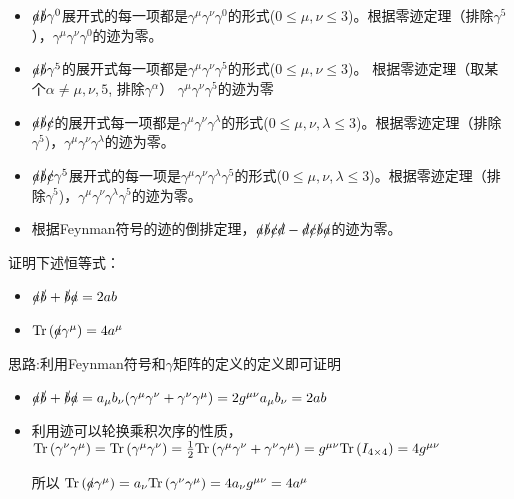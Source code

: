 \documentclass[CJK]{beamer}
\begin{document}
\begin{frame}
\bch
{\small
\begin{itemize}
\item{$\slashed{a}\slashed{b}\gamma^0$展开式的每一项都是$\gamma^\mu\gamma^\nu\gamma^0$的形式($0\le \mu,\nu\le 3$)。根据零迹定理（排除$\gamma^5$），$\gamma^\mu\gamma^\nu\gamma^0$的迹为零。}
\item{$\slashed{a}\slashed{b}\gamma^5$的展开式每一项都是$\gamma^\mu\gamma^\nu\gamma^5$的形式($0\le \mu,\nu\le 3$)。 根据零迹定理（取某个$\alpha \ne \mu,\nu, 5$, 排除$\gamma^\alpha$） $\gamma^\mu\gamma^\nu\gamma^5$的迹为零}
\item{$\slashed{a}\slashed{b}\slashed{c}$的展开式每一项都是$\gamma^\mu\gamma^\nu\gamma^\lambda$的形式($0\le \mu,\nu,\lambda\le 3$)。根据零迹定理（排除$\gamma^5$)，$\gamma^\mu\gamma^\nu\gamma^\lambda$的迹为零。}
\item{$\slashed{a}\slashed{b}\slashed{c}\gamma^5$展开式的每一项是$\gamma^\mu\gamma^\nu\gamma^\lambda\gamma^5$的形式($0\le \mu,\nu, \lambda \le 3$)。根据零迹定理（排除$\gamma^5$)，$\gamma^\mu\gamma^\nu\gamma^\lambda\gamma^5$的迹为零。}
\item{根据Feynman符号的迹的倒排定理，$\slashed{a}\slashed{b}\slashed{c}\slashed{d}-\slashed{d}\slashed{c}\slashed{b}\slashed{a}$的迹为零。}
\end{itemize}

}


\ech
\end{frame}

\begin{frame}
\bch
证明下述恒等式：
\begin{itemize}
\item{$\slashed{a}\slashed{b} + \slashed{b}\slashed{a} = 2 ab$}
\item{$\mathrm{Tr}\left(\slashed{a}\gamma^\mu\right) = 4 a^\mu$}
\end{itemize}

\skipline
思路:利用Feynman符号和$\gamma$矩阵的定义的定义即可证明
\ech
\end{frame}

\begin{frame}
\bch
\begin{itemize}
\item{$\slashed{a}\slashed{b} + \slashed{b}\slashed{a} = a_\mu b_\nu (\gamma^\mu\gamma^\nu+\gamma^\nu\gamma^\mu) = 2 g^{\mu\nu}a_\mu b_\nu = 2 ab$}
\item{利用迹可以轮换乘积次序的性质，$\mathrm{Tr}\left(\gamma^\nu\gamma^\mu\right) =\mathrm{Tr}\left(\gamma^\mu\gamma^\nu\right) =\frac{1}{2}\mathrm{Tr}\left(\gamma^\mu\gamma^\nu + \gamma^\nu\gamma^\mu\right) = g^{\mu\nu}\mathrm{Tr}\left(I_{4\times 4}\right) = 4 g^{\mu\nu}$

所以 $\mathrm{Tr}\left(\slashed{a}\gamma^\mu\right) = a_\nu \mathrm{Tr}\left(\gamma^\nu\gamma^\mu\right) =  4 a_\nu g^{\mu\nu} = 4 a^\mu$}
\end{itemize}

\ech
\end{frame}
\end{document}

